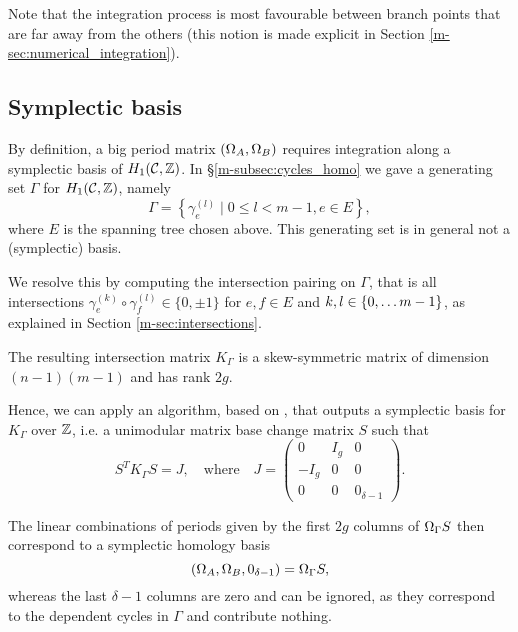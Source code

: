 \documentclass[main.tex]{subfiles}
\begin{document}
   Note that the integration process is most favourable
   between branch points that are far away from the others
   (this notion is made explicit in Section \ref{m-sec:numerical_integration}).

  \subsection{Symplectic basis}\label{subsec:symp_basis}

  By definition, a big period matrix $(\Omega_A,\Omega_B)$ requires integration along
  a symplectic basis of $H_1(\mathcal{C},\mathbb{Z})$. In \S \ref{m-subsec:cycles_homo} we gave
  a generating set $\Gamma$ for $H_1(\mathcal{C},\mathbb{Z})$, namely
  \begin{equation*}
    \Gamma = \left\{  \gamma_{e}^{(l)}  \mid  0 \le l < m-1,  e \in E  \right\},
  \end{equation*}
  where $E$ is the spanning tree chosen above. This generating set is
  in general not a (symplectic) basis.

  We resolve this by computing the intersection pairing on $\Gamma$, that
  is all intersections
  $\gamma_{e}^{(k)} \circ \gamma_{f}^{(l)}\in\{ 0,\pm 1\}$ for $e,f\in E$ and $k,l\in \left\{0,\dots m-1\right\}$,
  as explained in Section \ref{m-sec:intersections}.

  The resulting intersection matrix $K_{\Gamma}$
   is a skew-symmetric matrix of dimension \\ $(n-1)(m-1)$
   and has rank $2g$.

   Hence, we can apply an algorithm, based on
    \cite[Theorem 18]{KB2002}, that outputs a symplectic basis
   for $K_{\Gamma}$ over $\mathbb{Z}$, i.e. a unimodular matrix base change matrix $S$ such that
  $$S^T K_{\Gamma}  S = J, \quad \text{where} \quad J = \begin{pmatrix} 0 & I_g & 0 \\ -I_g & 0 & 0 \\ 0 & 0 & 0_{\delta-1} \end{pmatrix}.$$

  The linear combinations of periods given by the first $2g$ columns of $\Omega_{\Gamma} S$ then correspond to a symplectic homology basis
  \begin{equation*}\label{eq:symp_basis}
   (\Omega_A,\Omega_B, 0_{\delta-1}) = \Omega_{\Gamma} S,
  \end{equation*}
  whereas the last $\delta-1$ columns are zero and can be ignored, as they correspond to the dependent cycles
  in $\Gamma$ and contribute nothing.

\biblio
\end{document}
